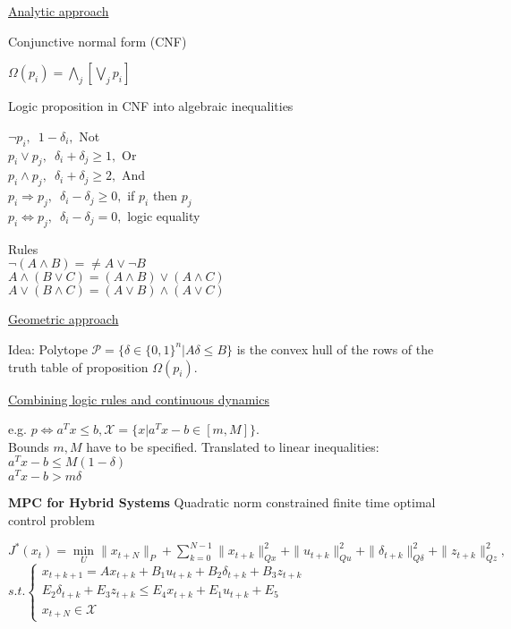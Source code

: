 \documentclass[10pt,parskip]{scrartcl}
\begin{document}
\begin{multicols*}{3}
\underline{ Analytic approach}

Conjunctive normal form (CNF)

$\Omega(p_i) = \bigwedge_j [\bigvee_j p_i]$

Logic proposition in CNF into algebraic inequalities

 $\neg p_i, \, \, \, 1-\delta_i,$ \hspace*{8mm} Not\\
 $ p_i \vee p_j, \, \, \, \delta_i+\delta_j \geq 1, $ \hspace*{8mm} Or\\
 $ p_i \wedge p_j, \, \, \, \delta_i+\delta_j \geq 2, $ \hspace*{8mm} And\\
 $ p_i \Rightarrow p_j, \, \, \, \delta_i-\delta_j \geq 0, $ \hspace*{8mm} if $p_i$ then $p_j$\\
 $ p_i \Leftrightarrow p_j, \, \, \, \delta_i-\delta_j = 0, $ \hspace*{8mm} logic equality
 
 Rules\\
 $ \neg (A \wedge B) = \neq A \vee \neg B$\\
 $A \wedge (B \vee C) = (A \wedge B) \vee (A\wedge C)$\\
 $ A \vee (B \wedge C) = (A\vee B)\wedge (A \vee C)$
 
 \underline{ Geometric approach}
 
 Idea: Polytope $\mathcal P = \{ \delta \in \{0,1\}^n | A\delta \leq B\}$ is the convex hull of the rows of the truth table of proposition $\Omega(p_i)$.


\underline{Combining logic rules and continuous dynamics}

e.g. $p \Leftrightarrow a^Tx \leq b, \mathcal X = \{x | a^T x-b \in [m, M]\}$.\\
 Bounds $m, M$ have to be specified. Translated to linear inequalities:\\
 \hspace*{8mm}$ a^T x-b \leq M(1-\delta)$\\
 \hspace*{8mm}$ a^T x-b > m \delta$
 
 \textbf{MPC for Hybrid Systems} Quadratic norm constrained finite time optimal control problem

$ J^*(x_t) = \min \limits_U \|x_{t+N}\|_P + \sum_{k=0}^{N-1} \|x_{t+k}\|_{Qx}^2 +\|u_{t+k}\|_{Qu}^2+\|\delta_{t+k}\|_{Q\delta}^2+\|z_{t+k}\|_{Qz}^2,$\\
\hspace*{8mm} $ s.t. \left \{  \begin{matrix}
 x_{t+k+1} = A x_{t+k} + B_1 u_{t+k} + B_2 \delta_{t+k} + B_3 z_{t+k}\\
 E_2 \delta_{t+k} + E_3 z_{t+k} \leq E_4 x_{t+k} + E_1 u_{t+k} + E_5\\
 x_{t+N} \in \mathcal X
\end{matrix} \right . $


\end{multicols*}
\end{document}
